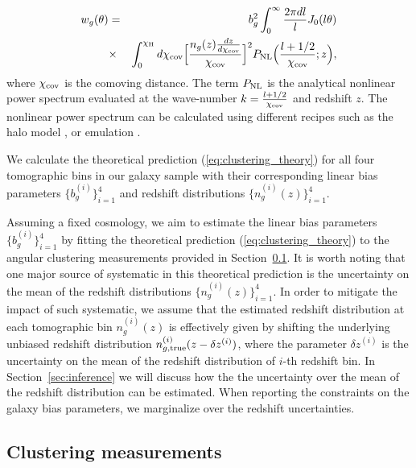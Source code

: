 \documentclass[fleqn,usenatbib,useAMS]{mnras}
\begin{document}
\begin{eqnarray}
w_{g}(\theta) &=& b_g^2 \int_{0}^{\infty} \frac{2\pi dl}{l}J_{0}(l\theta)  \nonumber \\ 
            &\times& \int_{0}^{\chi_{\rm H}} d\chi_{\rm cov} \Big[\frac{n_{g}(z)\frac{dz}{d\chi_{\rm cov}}}{\chi_{\rm cov}}\Big]^{2}P_{\rm NL}\Big(\frac{l+1/2}{\chi_{\rm cov}}; z\Big),                  
\label{eq:clustering_theory}
\end{eqnarray}
where $\chi_{\rm cov}$ is the comoving distance. The term $P_{\rm NL}$ is the analytical nonlinear power spectrum evaluated at the wave-number $k = \frac{l+1/2}{\chi_{\rm cov}}$ and redshift $z$. The nonlinear power spectrum can be calculated using different recipes such as the halo model \citep[e.g. ][]{takahashi2012, mead2015, smith2019}, or emulation \citep[e.g.][]{emu2014}. 

We calculate the theoretical prediction (\ref{eq:clustering_theory}) for all four tomographic bins in our galaxy sample with their corresponding linear bias parameters $\{b^{(i)}_{g}\}_{i=1}^{4}$ and redshift distributions $\{n^{(i)}_{g}(z)\}_{i=1}^{4}$.

Assuming a fixed cosmology, we aim to estimate the linear bias parameters $\{b^{(i)}_{g}\}_{i=1}^{4}$ by fitting the theoretical prediction (\ref{eq:clustering_theory}) to the angular clustering measurements provided in Section~\ref{sec:measurement}. It is worth noting that one major source of systematic in this theoretical prediction is the uncertainty on the mean of the redshift distributions $\{n_{g}^{(i)}(z)\}_{i=1}^{4}$. In order to mitigate the impact of such systematic, we assume that the estimated redshift distribution at each tomographic bin $n_{g}^{(i)}(z)$ is effectively given by shifting the underlying unbiased redshift distribution $n_{g, \rm true}^{(i)}(z - \delta z^{(i)})$, where the parameter $\delta z^{(i)}$ is the uncertainty on the mean of the redshift distribution of $i$-th redshift bin. In Section~\ref{sec:inference} we will 
discuss how the the uncertainty over the mean of the redshift distribution can be estimated. When reporting the constraints on the galaxy bias parameters, we marginalize over the redshift uncertainties. 

\subsection{Clustering measurements}\label{sec:measurement}
\end{document}
